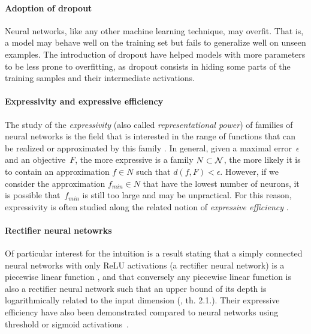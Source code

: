 \paragraph{Adoption of dropout}
Neural networks, like any other machine learning technique, may overfit. That is, a model may behave well on the training set but fails to generalize well on unseen examples. The introduction of dropout \citep{srivastava2014dropout} have helped models with more parameters to be less prone to overfitting, as dropout consists in hiding some parts of the training samples and their intermediate activations.

\paragraph{Expressivity and expressive efficiency}
The study of the \emph{expressivity} (also called \emph{representational power}) of families of neural networks is the field that is interested in the range of functions that can be realized or approximated by this family \citep{haastad1991power,pascanu2013number}. In general, given a maximal error~$\epsilon$ and an objective~$F$, the more expressive is a family $N \subset \mathcal{N}$, the more likely it is to contain an approximation $f \in N$ such that $d(f,F) < \epsilon$. However, if we consider the approximation $f_{min} \in N$ that have the lowest number of neurons, it is possible that~$f_{min}$ is still too large and may be unpractical. For this reason, expressivity is often studied along the related notion of \emph{expressive efficiency} \citep{delalleau2011shallow,cohen2018boosting}.
\label{par:expr}

\paragraph{Rectifier neural netowrks}
Of particular interest for the intuition is a result stating that a simply connected neural networks with only ReLU activations (a rectifier neural network) is a piecewise linear function \citep{pascanu2013number,montufar2014number}, and that conversely any piecewise linear function is also a rectifier neural network such that an upper bound of its depth is logarithmically related to the input dimension (\cite{arora2018understanding}, th. 2.1.). Their expressive efficiency have also been demonstrated compared to neural networks using threshold or sigmoid activations~\citep{pan2016expressiveness}.

